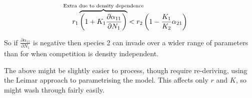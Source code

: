 \documentclass[12pt,a4paper]{article}
\begin{document}
\begin{equation}
  \label{eq:invasion-a1-v2}
  r_1\overbrace{\left(1 +
      K_1 \frac{\partial \alpha_{11}}{\partial N_1}
    \right)}^{\mathclap{\text{Extra due to density dependence}}} < r_2\left(1  - \frac{K_1}{K_2}\alpha_{21}\right)  
\end{equation}

So if $\frac{\partial \alpha_{11}}{\partial N_1}$ is negative then
species 2 can invade over a wider range of parameters than for when
competition is density independent.

The above might be slightly easier to process, though require
re-deriving, using the Leimar approach to parametrising the model.
This affects only $r$ and $K$, so might wash through fairly easily.
\end{document}
